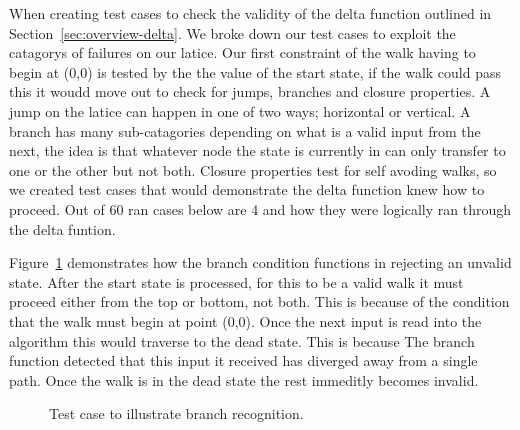 When creating test cases to check the validity of the delta function outlined in Section~\ref{sec:overview-delta}. We broke down our test cases to exploit the catagorys of failures on our latice. Our first constraint of the walk having to begin at (0,0) is tested by the the value of the start state, if the walk could pass this it woudd move out to check for jumps, branches and closure properties. A jump on the latice can happen in one of two ways; horizontal or vertical. A branch has many sub-catagories depending on what is a valid input from the next, the idea is that whatever node the state is currently in can only transfer to one or the other but not both. Closure properties test for self avoding walks, so we created test cases that would demonstrate the delta function knew how to proceed. Out of 60 ran cases below are 4 and how they were logically ran through the delta funtion. 

Figure~\ref{fig:test-branch} demonstrates how the branch condition functions in rejecting an unvalid state. After the start state is processed, for this to be a valid walk it must proceed either from the top or bottom, not both. This is because of the condition that the walk must begin at point (0,0). Once the next input is read into the algorithm this would traverse to the dead state. This is because The branch function detected that this input it received has diverged away from a single path. Once the walk is in the dead state the rest immeditly becomes invalid.
\begin{figure}[h!]
\begin{center}
\end{center}
\caption{Test case to illustrate branch recognition.}
\label{fig:test-branch}
\end{figure}

